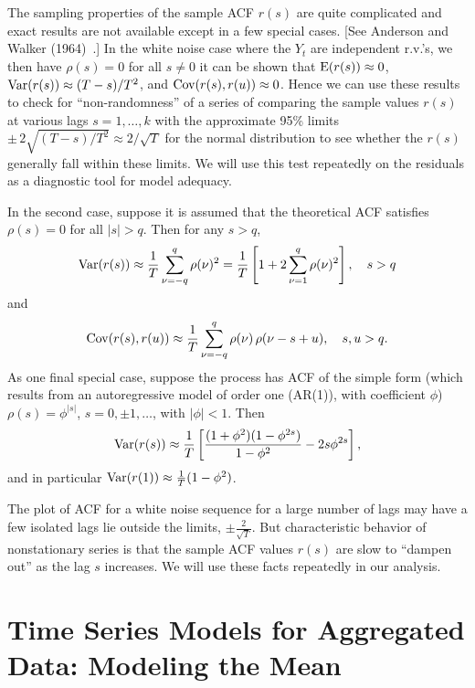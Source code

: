 The sampling properties of the sample ACF $r(s)$ are quite complicated and exact results are not available except in a few special cases. [See Anderson and Walker (1964)~\cite{anderwalk}.] In the white noise case where the $Y_t$ are independent r.v.'s, we then have $\rho(s)= 0$ for all $s \neq 0$ it can be shown that $\operatorname{E}(r(s)) \approx 0$, $\operatorname{Var}(r(s)) \approx (T-s)/T^2$, and $\operatorname{Cov}(r(s), r(u)) \approx 0$. Hence we can use these results to check for ``non-randomness'' of a series of comparing the sample values $r(s)$ at various lags $s=1, \ldots, k$ with the approximate 95\% limits $\pm \, 2 \sqrt{(T-s)/T^2} \approx 2 / \sqrt{T}$ for the normal distribution to see whether the $r(s)$ generally fall within these limits. We will use this test repeatedly on the residuals as a diagnostic tool for model adequacy. 


In the second case, suppose it is assumed that the theoretical ACF satisfies $\rho(s) = 0$ for all $|s| > q$.  Then for any $s > q$,
	\begin{equation} \label{eqn:varrs}
	\var(r(s)) \approx \dfrac{1}{T} \sum_{\nu=-q}^q \rho(\nu)^2= \dfrac{1}{T} \left[ 1 + 2 \sum_{\nu=1}^q \rho(\nu)^2 \right], \quad s > q 
	\end{equation}        
and
	\[
	\operatorname{Cov}(r(s), r(u)) \approx \frac{1}{T} \sum_{\nu = -q}^{q} \rho(\nu)\, \rho(\nu - s + u), \quad s,u > q.
	 \]
As one final special case, suppose the process  has ACF of the simple form (which results from an autoregressive model of order one (AR(1)), with coefficient $\phi$) $\rho(s) = \phi^{|s|}$, $s= 0, \pm 1, \ldots$, with $\lvert \phi \rvert < 1$. Then
	\[
	\operatorname{Var}(r(s)) \approx \frac{1}{T} \left[ \frac{(1 + \phi^2) (1 - \phi^{2s})}{1 - \phi^2} - 2s \phi^{2s} \right],
	\]
and in particular $\operatorname{Var}(r(1)) \approx \frac{1}{T} (1 - \phi^2)$.


The plot of ACF for a white noise sequence for a large number of lags may have a few isolated lags lie outside the limits, $\pm \frac{2}{\sqrt{T}}$. But characteristic behavior of nonstationary series is that the sample ACF values $r(s)$ are slow to ``dampen out'' as the lag $s$ increases. We will use these facts repeatedly in our analysis. 



\section{Time Series Models for Aggregated Data:  Modeling the Mean \label{sec:model_mean}} \label{in:modelmean}


